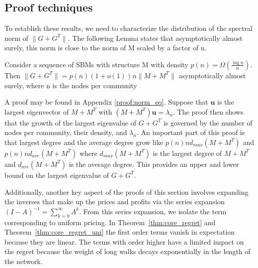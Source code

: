 \subsection{Proof techniques}  To establish these results, we need to characterize the distribution of the spectral norm of $\|G+G^T\|$. The following Lemma states that asymptotically almost surely, this norm is close to the norm of M scaled by a factor of n. 

\begin{lemma}\label{lem:norm_eq}
    Consider a sequence of SBMs with structure M with density $p(n) = \Omega(\frac{\log n}{n})$. Then $\|G+G^T\| = p(n) \left(1+ o(1)\right) n \| M+M^T\| $ asymptotically almost surely, where n is the nodes per community 
\end{lemma}
A proof may be found in Appendix \ref{proof:norm_eq}. Suppose that $\mathbf{u}$ is the largest eigenvector of $M+M^T$ with $(M+M^T) \mathbf{u} = \lambda_n$. The proof then shows that the growth of the largest eigenvalue of $G+G^T$ is governed by the number of nodes per community, their density, and $\lambda_n$. An important part of this proof is that largest degree and the average degree grow like $p(n) n d_{max}(M+M^T)$ and $p(n) n d_{ave}( M+M^T)$ where $d_{max}(M+M^T)$ is the largest degree of $M+M^T$ and $d_{ave}(M+M^T)$ is the average degree. This provides an upper and lower bound on the largest eigenvalue of $G+G^T$.

Additionally, another key aspect of the proofs of this section involves expanding the inverses that make up the prices and profits via the series expansion $(I - A)^{-1} = \sum_{k=0}^\infty A^k$.  From this series expansion,  we isolate the term corresponding to uniform pricing. In Theorem~\ref{thm:core_regret} and Theorem~\ref{thm:core_regret_uni} the first order terms vanish in expectation because they are linear. The terms with order higher have a limited impact on the regret because the weight of long walks decays exponentially in the length of the network. 


